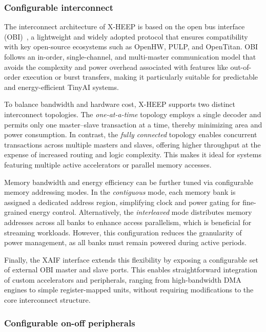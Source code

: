             \subsubsection*{Configurable interconnect}
            
                The interconnect architecture of \mbox{X-HEEP} is based on the open bus interface (OBI)~\cite{obi}, a lightweight and widely adopted protocol that ensures compatibility with key open-source ecosystems such as OpenHW, PULP, and OpenTitan. OBI follows an in-order, single-channel, and multi-master communication model that avoids the complexity and power overhead associated with features like out-of-order execution or burst transfers, making it particularly suitable for predictable and energy-efficient TinyAI systems.
                
                To balance bandwidth and hardware cost, \mbox{X-HEEP} supports two distinct interconnect topologies. The \emph{one-at-a-time} topology employs a single decoder and permits only one master–slave transaction at a time, thereby minimizing area and power consumption. In contrast, the \emph{fully connected} topology enables concurrent transactions across multiple masters and slaves, offering higher throughput at the expense of increased routing and logic complexity. This makes it ideal for systems featuring multiple active accelerators or parallel memory accesses.
                
                Memory bandwidth and energy efficiency can be further tuned via configurable memory addressing modes. In the \emph{contiguous} mode, each memory bank is assigned a dedicated address region, simplifying clock and power gating for fine-grained energy control. Alternatively, the \emph{interleaved} mode distributes memory addresses across all banks to enhance access parallelism, which is beneficial for streaming workloads. However, this configuration reduces the granularity of power management, as all banks must remain powered during active periods.
                
                Finally, the XAIF interface extends this flexibility by exposing a configurable set of external OBI master and slave ports. This enables straightforward integration of custom accelerators and peripherals, ranging from high-bandwidth DMA engines to simple register-mapped units, without requiring modifications to the core interconnect structure.

            \subsubsection*{Configurable on-off peripherals}
            
